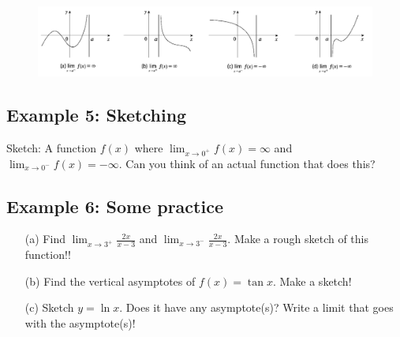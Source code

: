 \documentclass[10pt]{book}
\theoremstyle{definition}
\begin{document}
\begin{figure}[h!]
    \centering
    \includegraphics[scale=0.65]{fig5.png}
\end{figure}

\subsection*{Example 5: Sketching} Sketch: A function $f(x)$ where $\displaystyle\lim_{x\rightarrow 0^+}f(x)=\infty$ and $\displaystyle\lim_{x\rightarrow 0^-}f(x)=-\infty$. Can you think of an actual function that does this?
\clearpage
\subsection*{Example 6: Some practice}
\begin{itemize}
    \item[(a)] Find $\displaystyle\lim_{x\rightarrow 3^+}\frac{2x}{x-3}$ and  $\displaystyle\lim_{x\rightarrow 3^-}\frac{2x}{x-3}$. Make a rough sketch of this function!!\vspace{3in}
    \item[(b)] Find the vertical asymptotes of $f(x)=\tan x$. Make a sketch!\vspace{3in}
    \item[(c)] Sketch $y=\ln x$. Does it have any asymptote(s)? Write a limit that goes with the asymptote(s)!
\end{itemize}
\end{document}

